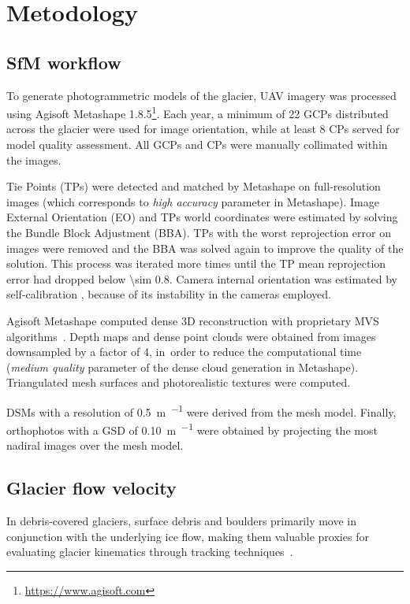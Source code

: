\section{Metodology}\label{sec:3:methodology}

\subsection{SfM workflow}\label{sec:3:sfm}

To generate photogrammetric models of the glacier, UAV imagery was processed using 
Agisoft Metashape 1.8.5\footnote{\url{https://www.agisoft.com}}.
Each year, a minimum of 22 GCPs distributed across the glacier were used for image 
orientation, while at least 8 CPs served for model quality assessment.  
All GCPs and CPs were manually collimated within the images.

Tie Points (TPs) were detected and matched by Metashape on full-resolution images (which
corresponds to \textit{high accuracy} parameter in Metashape).
Image External Orientation (EO) and TPs world coordinates were estimated by solving the
Bundle Block Adjustment (BBA).
TPs with the worst reprojection error on images were removed and the BBA was solved again to improve the quality of the solution.
This process was iterated more times until the TP mean reprojection error had dropped below
\SI{\sim 0.8}{\pixel}.
Camera internal orientation was estimated by self-calibration
\citep{Fraser2013, Cramer2017}, because of its instability in the cameras employed.

Agisoft Metashape computed dense 3D reconstruction with proprietary MVS
algorithms~\citep{Dallasta}.
Depth maps and dense point clouds were obtained from images downsampled by a factor of 4, in~order to reduce the computational time (\textit{medium quality} parameter of the dense cloud generation in Metashape).
Triangulated mesh surfaces and photorealistic textures were computed.

DSMs with a resolution of \SI{0.5}{\meter\per\pixel} were derived from the mesh model.
Finally, orthophotos with a GSD of \SI{0.10}{\meter\per\pixel} were obtained by
projecting the most nadiral images over the mesh model.

\subsection{Glacier flow velocity}\label{sec:3:method_velocity}

In debris-covered glaciers, surface debris and boulders primarily move in conjunction with the underlying ice flow, making them valuable proxies for evaluating glacier kinematics through tracking techniques~\citep{Dehecq2015, Sam2016, Blothe2021}.

